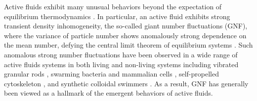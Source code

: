 \documentclass[twocolumn,aps,prl,amsmath,amssymb,longbibliography]{revtex4-2}
\begin{document}
Active fluids exhibit many unusual behaviors beyond the expectation of equilibrium thermodynamics \cite{Ramaswamy2010,Cates2012,Marchetti2013,Poon2013,Elgeti2015}.
In particular, an active fluid exhibits strong transient density inhomogeneity, the so-called giant number fluctuations (GNF), where the variance of particle number shows anomalously strong dependence on the mean number, defying the central limit theorem of equilibrium systems \cite{Mishin2015}.
Such anomalous strong number fluctuations have been observed in a wide range of active fluids systems in both living and non-living systems including vibrated granular rods \cite{Narayan2007,Aranson2008,Kudrolli2008,Deseigne2010},
swarming bacteria \cite{Zhang2010,Nishiguchi2017} and mammalian cells \cite{Kawaguchi2017},
self-propelled cytoskeleton \cite{Schaller2013}, and synthetic colloidal swimmers \cite{Palacci2013,Karani2019}. As a result, GNF has generally been viewed as a hallmark of the emergent behaviors of active fluids.
\end{document}
